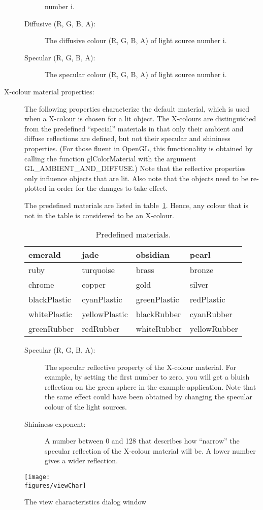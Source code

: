 \begin{description}
\begin{description}
number i.
\item[Diffusive (R, G, B, A):]The diffusive colour (R, G, B, A) of light source
number i.
\item[Specular (R, G, B, A):]The specular colour (R, G, B, A) of light source
number i.
\end{description}
%
\item[X-colour material properties:] The following properties
characterize the default material, which is used when a X-colour is
chosen for a lit object. The X-colours are distinguished from the
predefined ``special'' materials in that only their ambient and
diffuse reflections are defined, but not their specular and shininess
properties. (For those fluent in OpenGL, this functionality is
obtained by calling the function glColorMaterial with the argument
GL\_AMBIENT\_AND\_DIFFUSE.)  Note that the reflective properties only
influence objects that are lit. Also note that the objects need to be
re-plotted in order for the changes to take effect.

The predefined materials are listed in table~\protect\ref{tab:colours}. Hence,
any colour that is not in the table is considered to be an X-colour.
%
\begin{table}[h]
\begin{center}
\begin{tabular}{|l|l|l|l|} \hline
 emerald &  jade & obsidian &  pearl \\ \hline
 ruby &  turquoise &  brass &  bronze \\ \hline
 chrome &  copper &  gold & silver \\ \hline
 blackPlastic &  cyanPlastic &  greenPlastic &  redPlastic \\ \hline 
 whitePlastic &  yellowPlastic &  blackRubber &  cyanRubber \\ \hline
 greenRubber & redRubber &  whiteRubber &  yellowRubber \\ \hline
\end{tabular}
  \caption{Predefined materials.}\label{tab:colours}
\end{center}
\end{table}
%
\begin{description}
\item[Specular (R, G, B, A):]The specular reflective property of the
X-colour material. For example, by setting the first number to
zero, you will get a bluish reflection on the green sphere in the
example application. Note that the same effect could have been
obtained by changing the specular colour of the light sources.
\item[Shininess exponent:]A number between 0 and 128 that describes
how ``narrow'' the specular reflection of the X-colour material will
be. A lower number gives a wider reflection.
\end{description}
%
\end{description}
%
\begin{figure}
  \begin{center}
    \texttt{[image: \\figures/viewChar]}
  \caption{The view characteristics dialog window}\label{fig:view-char}
  \end{center}
\end{figure}


